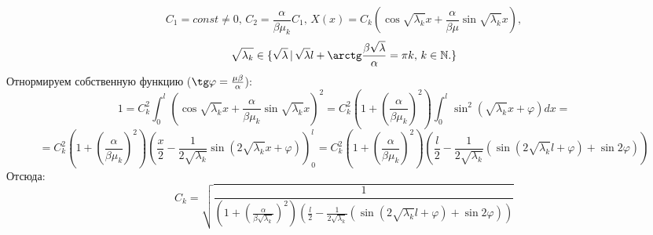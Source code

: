 \documentclass[12pt, a4paper]{article}
\begin{document}
\[ C_{1} = const \ne 0, \, C_{2} = \frac{\alpha}{\beta \mu_{k}} C_{1}, \, X(x) = C_{k} (\cos \sqrt{\lambda_{k}} x + \frac{\alpha}{\beta \mu} \sin \sqrt{\lambda_{k}} x), \]
\[ \sqrt{\lambda_{k}} \in \{ \sqrt{\lambda} \, | \, \sqrt{\lambda} l + \arctg \frac{\beta \sqrt{\lambda}}{\alpha} = \pi k, \, k \in \mathbb{N}. \} \]
Отнормируем собственную функцию ($\tg \varphi = \frac{\mu \beta}{\alpha}$):
\[ 1 = C_{k}^2 \int_{0}^{l} (\cos \sqrt{\lambda_{k}} x + \frac{\alpha}{\beta \mu_{k}} \sin \sqrt{\lambda_{k}} x)^2 = C_{k}^2 (1 + (\frac{\alpha}{\beta \mu_{k}})^2) \int_{0}^{l} \sin^2 (\sqrt{\lambda_{k}}x + \varphi) dx = \]
\[ = C_{k}^2 (1 + (\frac{\alpha}{\beta \mu_{k}})^2) (\frac{x}{2} - \frac{1}{2\sqrt{\lambda_{k}}} \sin (2\sqrt{\lambda_{k}}x + \varphi))_{0}^{l} = C_{k}^2 (1 + (\frac{\alpha}{\beta \mu_{k}})^2) (\frac{l}{2} - \frac{1}{2\sqrt{\lambda_{k}}} (\sin (2\sqrt{\lambda_{k}}l + \varphi) + \sin 2\varphi))\]
Отсюда:
\[ C_{k} = \sqrt{\frac{1}{(1 + (\frac{\alpha}{\beta \sqrt{\lambda_{k}}})^2) (\frac{l}{2} - \frac{1}{2\sqrt{\lambda_{k}}} (\sin (2\sqrt{\lambda_{k}}l + \varphi) + \sin 2\varphi))}} \]
\end{document}
